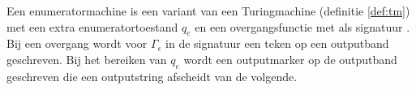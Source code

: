 Een enumeratormachine is een variant van een Turingmachine (definitie \ref{def:tm}) met een extra enumeratortoestand $q_e$ en een overgangsfunctie met als signatuur . Bij een overgang wordt voor $\Gamma_\epsilon$ in de signatuur een teken op een outputband geschreven. Bij het bereiken van $q_e$ wordt een outputmarker op de outputband geschreven die een outputstring afscheidt van de volgende.